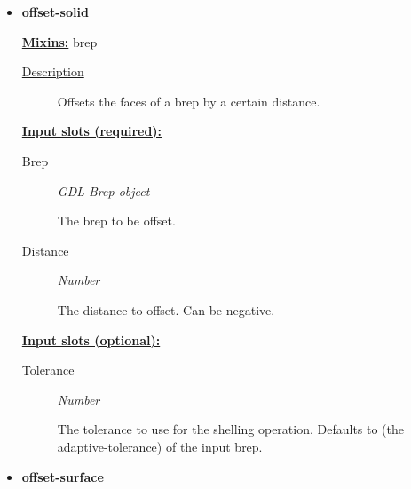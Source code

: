 \documentclass [11pt]{book}
\begin{document}
\begin{itemize}
\item {}
\label{prim:offset-solid}
\textbf{offset-solid}


\textbf{
\underline{Mixins:}} brep





\begin{description}

\item [
\underline{Description}]


Offsets the faces of a brep by a certain distance.



\end{description}








\textbf{
\underline{Input slots (required):}}

\begin{description}

\item [Brep]
\emph{GDL Brep object}

 The brep to be offset.




\item [Distance]
\emph{Number}

 The distance to offset. Can be negative.




\end{description}






\textbf{
\underline{Input slots (optional):}}

\begin{description}

\item [Tolerance]
\emph{Number}

 The tolerance to use for the shelling operation.
Defaults to (the adaptive-tolerance) of the input brep.




\end{description}







\item {}
\label{prim:offset-surface}
\textbf{offset-surface}



\end{itemize}
\end{document}
